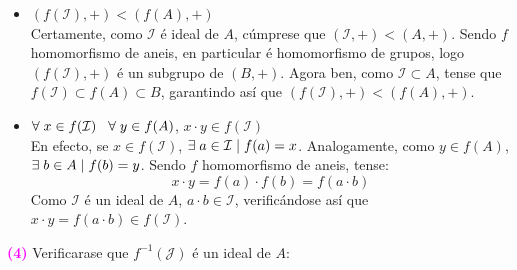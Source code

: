 \documentclass[twoside]{report}
\newcommand{\magbf}[1]{\textcolor{magenta}{\textbf{#1}}} %
\theoremstyle{mystyle}
\begin{document}
\begin{itemize}
    \item $(f(\mathcal{I}), +) < (f(A), +)$\\
    
    Certamente, como $\mathcal{I}$ é ideal de $A$, cúmprese que $(\mathcal{I},+) < (A, +)$. Sendo $f$ homomorfismo de aneis, en particular é homomorfismo de grupos, logo $(f(\mathcal{I}), +)$ é un subgrupo de $(B, +)$. Agora ben, como $\mathcal{I} \subset A$, tense que $f(\mathcal{I}) \subset f(A) \subset B$, garantindo así que $(f(\mathcal{I}), +) < (f(A), +)$. \\
    
    \item $\forall \hspace{1mm} x\in f(\mathcal{I}) \hspace{3mm} \forall \hspace{1mm} y \in f(A)$, $x \cdot y \in f(\mathcal{I})$\\
    
    En efecto, se $x \in f(\mathcal{I})$, $\exists \hspace{1mm} a \in \mathcal{I} \hspace{1mm} | \hspace{1mm} f(a) = x$. Analogamente, como $y \in f(A)$, $\exists \hspace{1mm} b \in A \hspace{1mm} | \hspace{1mm} f(b) = y$. Sendo $f$ homomorfismo de aneis, tense:
    $$x \cdot y = f(a) \cdot f(b) = f(a \cdot b)$$
    Como $\mathcal{I}$ é un ideal de $A$, $a \cdot b \in \mathcal{I}$, verificándose así que $x \cdot y = f(a \cdot b) \in f(\mathcal{I})$.\\
\end{itemize}

\magbf{(4)} Verificarase que $f^{-1}(\mathcal{J})$ é un ideal de $A$:
\end{document}
